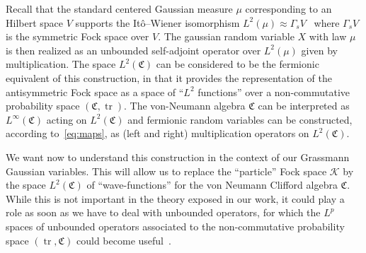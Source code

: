 \documentclass[11pt]{article}
\newcommand{\tmop}[1]{\ensuremath{\operatorname{#1}}}
\begin{document}
\begin{remark}
  Recall that the standard centered Gaussian measure $\mu$ corresponding to an
  Hilbert space $V$ supports the It\^{o}--Wiener isomorphism $L^2 (\mu)
  \approx \Gamma_s V$ \ where $\Gamma_s V$ is the symmetric Fock space over
  $V$. The gaussian random variable $X$ with law $\mu$ is then realized as an
  unbounded self-adjoint operator over $L^2 (\mu)$ given by multiplication.
  The space $L^2 (\mathfrak{C})$ can be considered to be the fermionic
  equivalent of this construction, in that it provides the representation of
  the antisymmetric Fock space as a space of ``$L^2$ functions'' over a
  non-commutative probability space $(\mathfrak{C}, \tmop{tr})$. The
  von-Neumann algebra $\mathfrak{C}$ can be interpreted as $L^{\infty}
  (\mathfrak{C})$ acting on $L^2 (\mathfrak{C})$ and fermionic random
  variables can be constructed, according to~{\eqref{eq:maps}}, as (left and
  right) multiplication operators on $L^2 (\mathfrak{C})$.
\end{remark}

We want now to understand this construction in the context of our Grassmann
Gaussian variables. This will allow us to replace the ``particle'' Fock space
$\mathcal{K}$ by the space $L^2 (\mathfrak{C})$ of ``wave-functions'' for the
von Neumann Clifford algebra $\mathfrak{C}$. While this is not important in
the theory exposed in our work, it could play a role as soon as we have to
deal with unbounded operators, for which the $L^p$ spaces of unbounded
operators associated to the non-commutative probability space $(\tmop{tr},
\mathfrak{C})$ could become useful~{\cite{gross_existence_1972}}.

\
\end{document}
